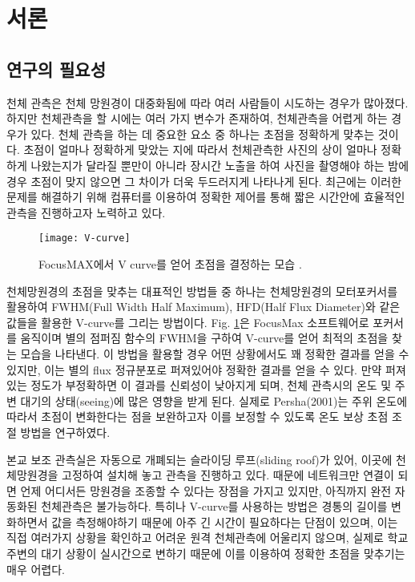 

\section{서론}
\subsection{연구의 필요성}

천체 관측은 천체 망원경이 대중화됨에 따라 여러 사람들이 시도하는 경우가 많아졌다. 하지만 천체관측을 할 시에는 여러 가지 변수가 존재하여, 천체관측을 어렵게 하는 경우가 있다. 천체 관측을 하는 데 중요한 요소 중 하나는 초점을 정확하게 맞추는 것이다. 초점이 얼마나 정확하게 맞았는 지에 따라서 천체관측한 사진의 상이 얼마나 정확하게 나왔는지가 달라질 뿐만이 아니라 장시간 노출을 하여 사진을 촬영해야 하는 밤에 경우 초점이 맞지 않으면 그 차이가 더욱 두드러지게 나타나게 된다. 최근에는 이러한 문제를 해결하기 위해 컴퓨터를 이용하여 정확한 제어를 통해 짧은 시간안에 효율적인 관측을 진행하고자 노력하고 있다.

\begin{figure}[h]
	\begin{center}
		\texttt{[image: V-curve]}
	\end{center}
	\caption{FocusMAX에서 V curve를 얻어 초점을 결정하는 모습 \cite{weber2001fast}.}
	\label{V-curve}
\end{figure}

천체망원경의 초점을 맞추는 대표적인 방법들 중 하나는 천체망원경의 모터포커서를 활용하여 FWHM(Full Width Half Maximum), HFD(Half Flux Diameter)와 같은 값들을 활용한 V-curve를 그리는 방법이다. Fig. \ref{V-curve}은 FocusMax 소프트웨어로 포커서를 움직이며 별의 점퍼짐 함수의 FWHM을 구하여 V-curve를 얻어 최적의 초점을 찾는 모습을 나타낸다. 이 방법을 활용할 경우 어떤 상황에서도 꽤 정확한 결과를 얻을 수 있지만, 이는 별의 flux 정규분포로 퍼져있어야 정확한 결과를 얻을 수 있다. 만약 퍼져있는 정도가 부정확하면 이 결과를 신뢰성이 낮아지게 되며, 천체 관측시의 온도 및 주변 대기의 상태(seeing)에 많은 영향을 받게 된다. 실제로 Persha(2001)는 주위 온도에 따라서 초점이 변화한다는 점을 보완하고자 이를 보정할 수 있도록 온도 보상 초점 조절 방법을 연구하였다.\cite{persha2001temperature}


본교 보조 관측실은 자동으로 개폐되는 슬라이딩 루프(sliding roof)가 있어, 이곳에 천체망원경을 고정하여 설치해 놓고 관측을 진행하고 있다. 때문에 네트워크만 연결이 되면 언제 어디서든 망원경을 조종할 수 있다는 장점을 가지고 있지만, 아직까지 완전 자동화된 천체관측은 불가능하다. 특히나 V-curve를 사용하는 방법은 경통의 길이를 변화하면서 값을 측정해야하기 때문에 아주 긴 시간이 필요하다는 단점이 있으며, 이는 직접 여러가지 상황을 확인하고 어려운 원격 천체관측에 어울리지 않으며, 실제로 학교 주변의 대기 상황이 실시간으로 변하기 때문에 이를 이용하여 정확한 초점을 맞추기는 매우 어렵다.


